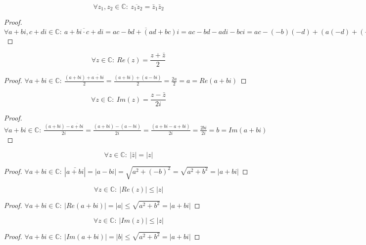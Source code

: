 \documentclass[main.tex]{subfiles}
\begin{document}
\begin{pr}
  \[ \forall z_{1},z_{2}\in \mathbb{C}:\ \overline{z_{1}z_{2}} = \bar{z}_{1}  \bar{z}_{2} \]

  \begin{proof}
    $\forall a+bi,c+di \in \mathbb{C}:\ \overline{a+bi \cdot c+di} = \overline{ac-bd + (ad+bc)i} = ac-bd - adi - bci = ac-(-b)(-d) + (a(-d)+(-b)c)i = \overline{a+bi} \cdot \overline{c+di} $
  \end{proof}
\end{pr}

\begin{pr}
  \[ \forall z\in \mathbb{C}:\ Re(z) = \frac{z+\bar{z}}{2} \]

  \begin{proof}
    $\forall a+bi\in \mathbb{C}:\ \frac{(a+bi)+\overline{a+bi}}{2} = \frac{(a+bi)+(a-bi)}{2} = \frac{2a}{2} = a = Re(a+bi)$
  \end{proof}
\end{pr}

\begin{pr}
  \[ \forall z\in \mathbb{C}:\ Im(z) = \frac{z-\bar{z}}{2i} \]

  \begin{proof}
    $\forall a+bi\in \mathbb{C}:\ \frac{(a+bi)-\overline{a+bi}}{2i} = \frac{(a+bi)-(a-bi)}{2i} = \frac{(a+bi-a+bi)}{2i} = \frac{2bi}{2i} = b = Im(a+bi) $
  \end{proof}
\end{pr}

\begin{pr}
  \[ \forall z\in \mathbb{C}:\ |\bar{z}| = |z| \]

  \begin{proof}
    $\forall a+bi\in \mathbb{C}:\ |\bar{a+bi}| = |a-bi| = \sqrt{a^{2}+(-b)^{2}} = \sqrt{a^{2}+b^{2}} = |a+bi|$
  \end{proof}
\end{pr}

\begin{pr}
  \label{pr:reel-deel-kleine}
  \[ \forall z\in \mathbb{C}:\ |Re(z)| \le |z| \]

  \begin{proof}
    $\forall a+bi\in \mathbb{C}:\  |Re(a+bi)| = |a| \le \sqrt{a^{2}+b^{2}} = |a+bi|$ 
  \end{proof}
\end{pr}

\begin{pr}
  \label{pr:imaginair-deel-kleiner}
  \[ \forall z\in \mathbb{C}:\ |Im(z)| \le |z|\]

  \begin{proof}
    $\forall a+bi\in \mathbb{C}:\  |Im(a+bi)| = |b| \le \sqrt{a^{2}+b^{2}} = |a+bi|$ 
  \end{proof}
\end{pr}
\end{document}
